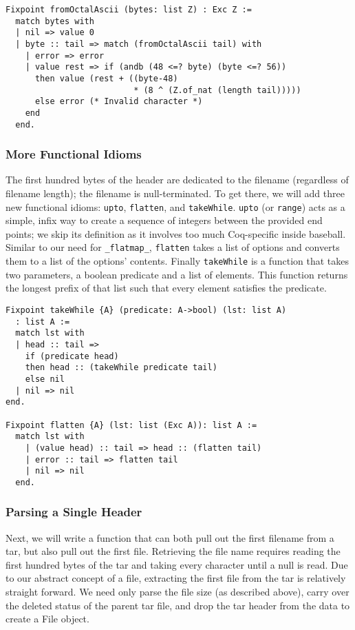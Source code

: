 \documentclass[nocopyrightspace]{sigplanconf}
\begin{document}
\begin{lstlisting}
Fixpoint fromOctalAscii (bytes: list Z) : Exc Z :=
  match bytes with
  | nil => value 0
  | byte :: tail => match (fromOctalAscii tail) with
    | error => error
    | value rest => if (andb (48 <=? byte) (byte <=? 56))
      then value (rest + ((byte-48)
                          * (8 ^ (Z.of_nat (length tail)))))
      else error (* Invalid character *)
    end
  end.
\end{lstlisting}

\subsubsection{More Functional Idioms}

The first hundred bytes of the header are dedicated to the filename
(regardless of filename length); the filename is null-terminated. To get
there, we will add three new functional idioms: {\tt upto}, {\tt flatten}, and
{\tt takeWhile}. {\tt upto} (or {\tt range}) acts as a simple, infix way to
create a sequence of integers between the provided end points; we skip its
definition as it involves too much Coq-specific inside baseball. Similar to
our need for {\tt \_flatmap\_}, {\tt flatten} takes a list of options and
converts them to a list of the options' contents. Finally {\tt takeWhile} is a
function that takes two parameters, a boolean predicate and a list of
elements. This function returns the longest prefix of that list such that
every element satisfies the predicate.

\begin{lstlisting}
Fixpoint takeWhile {A} (predicate: A->bool) (lst: list A)
  : list A :=
  match lst with
  | head :: tail => 
    if (predicate head) 
    then head :: (takeWhile predicate tail)
    else nil
  | nil => nil
end.

Fixpoint flatten {A} (lst: list (Exc A)): list A :=
  match lst with
    | (value head) :: tail => head :: (flatten tail)
    | error :: tail => flatten tail
    | nil => nil
  end.
\end{lstlisting}

\subsubsection{Parsing a Single Header}
Next, we will write a function that can both pull out the first filename from
a tar, but also pull out the first file. Retrieving the file name requires
reading the first hundred bytes of the tar and taking every character until a
null is read. Due to our abstract concept of a file, extracting the first file
from the tar is relatively straight forward. We need only parse the file size
(as described above), carry over the deleted status of the parent tar file,
and drop the tar header from the data to create a File object.
\end{document}
